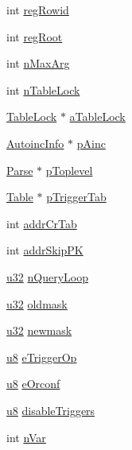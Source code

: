 \begin{DoxyCompactItemize}
\item 
int \hyperlink{struct_parse_afcd981375c0bf35857b02dd8b6eb404c}{reg\+Rowid}
\item 
int \hyperlink{struct_parse_a4c486443f1dec8ebc5ed3d7bebd5ab3f}{reg\+Root}
\item 
int \hyperlink{struct_parse_a6ccdb6f869078cb97158ed463cdfe3e8}{n\+Max\+Arg}
\item 
int \hyperlink{struct_parse_a089d91549eb1eb389c4a660bb3e8a6c0}{n\+Table\+Lock}
\item 
\hyperlink{struct_table_lock}{Table\+Lock} $\ast$ \hyperlink{struct_parse_a2a8278088c2da698f2cbd33fa56a5834}{a\+Table\+Lock}
\item 
\hyperlink{struct_autoinc_info}{Autoinc\+Info} $\ast$ \hyperlink{struct_parse_af29cefdbafae7365c8fc16b81766a646}{p\+Ainc}
\item 
\hyperlink{struct_parse}{Parse} $\ast$ \hyperlink{struct_parse_adb730f8e7fa964ef4dd94d64eaed12b6}{p\+Toplevel}
\item 
\hyperlink{struct_table}{Table} $\ast$ \hyperlink{struct_parse_aef9d50c97b68250054207a21b19c6543}{p\+Trigger\+Tab}
\item 
int \hyperlink{struct_parse_af5f471745ae69852db1968e036d15e30}{addr\+Cr\+Tab}
\item 
int \hyperlink{struct_parse_a5e0fd8725f252f5ecaceeb20a054c566}{addr\+Skip\+P\+K}
\item 
\hyperlink{sqlite3_8c_a03ad5adfaeb9b7640dde78a0cc390319}{u32} \hyperlink{struct_parse_ad94b55c666d5c00f9be8f0245af57bad}{n\+Query\+Loop}
\item 
\hyperlink{sqlite3_8c_a03ad5adfaeb9b7640dde78a0cc390319}{u32} \hyperlink{struct_parse_a5570817d80b8691fbc101651329665c2}{oldmask}
\item 
\hyperlink{sqlite3_8c_a03ad5adfaeb9b7640dde78a0cc390319}{u32} \hyperlink{struct_parse_aa36ace4eeccdcabc2a3295de12277fb9}{newmask}
\item 
\hyperlink{sqlite3_8c_a74a0f6424ae628af25f23f0a35f6ead3}{u8} \hyperlink{struct_parse_a9c29be1e83ed4451bfec886577d22b5b}{e\+Trigger\+Op}
\item 
\hyperlink{sqlite3_8c_a74a0f6424ae628af25f23f0a35f6ead3}{u8} \hyperlink{struct_parse_a08f37932fed75dc4be553b8db2378db5}{e\+Orconf}
\item 
\hyperlink{sqlite3_8c_a74a0f6424ae628af25f23f0a35f6ead3}{u8} \hyperlink{struct_parse_ae3495fc2dbc5996dd427e9244b1cf8e6}{disable\+Triggers}
\item 
int \hyperlink{struct_parse_a4daa0b7f57ad0254db068b40eaa0d8b9}{n\+Var}

\end{DoxyCompactItemize}
